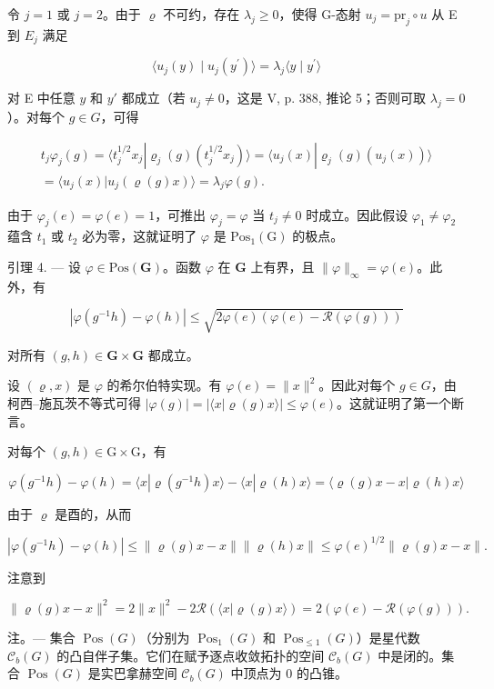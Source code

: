 令 \(j = 1\) 或 \(j = 2\)。由于 \(\varrho\) 不可约，存在 \(\lambda_j \geqslant 0\)，使得 G-态射 \(u_j = \mathrm{pr}_j \circ u\) 从 E 到 \(E_j\) 满足

\[
\langle u _ {j} (y) \mid u _ {j} (y ^ {\prime}) \rangle = \lambda_ {j} \langle y \mid y ^ {\prime} \rangle
\]

对 E 中任意 \(y\) 和 \(y'\) 都成立（若 \(u_j \neq 0\)，这是 V, p. 388, 推论 5；否则可取 \(\lambda_j = 0\)）。对每个 \(g \in G\)，可得

\[
\begin{array}{r} t _ {j} \varphi_ {j} (g) = \langle t _ {j} ^ {1 / 2} x _ {j} | \varrho_ {j} (g) (t _ {j} ^ {1 / 2} x _ {j}) \rangle = \langle u _ {j} (x) | \varrho_ {j} (g) (u _ {j} (x)) \rangle \\ = \langle u _ {j} (x) | u _ {j} (\varrho (g) x) \rangle = \lambda_ {j} \varphi (g). \end{array}
\]

由于 \(\varphi_{j}(e) = \varphi(e) = 1\)，可推出 \(\varphi_{j} = \varphi\) 当 \(t_{j} \neq 0\) 时成立。因此假设 \(\varphi_{1} \neq \varphi_{2}\) 蕴含 \(t_{1}\) 或 \(t_{2}\) 必为零，这就证明了 \(\varphi\) 是 \(\mathrm{Pos}_{1}(\mathrm{G})\) 的极点。

引理 4. --- 设 \(\varphi\in\mathrm{Pos}(\mathbf{G})\)。函数 \(\varphi\) 在 \(\mathbf{G}\) 上有界，且 \(\|\varphi\|_{\infty}=\varphi(e)\)。此外，有

\[
| \varphi (g ^ {- 1} h) - \varphi (h) | \leqslant \sqrt {2 \varphi (e) (\varphi (e) - \mathcal {R} (\varphi (g)))}\tag{1}
\]

对所有 \((g,h)\in \mathbf{G}\times \mathbf{G}\) 都成立。

设 \((\varrho, x)\) 是 \(\varphi\) 的希尔伯特实现。有 \(\varphi(e) = \|x\|^2\)。因此对每个 \(g \in G\)，由柯西–施瓦茨不等式可得 \(|\varphi(g)| = |\langle x | \varrho(g)x\rangle| \leqslant \varphi(e)\)。这就证明了第一个断言。

对每个 \((g,h)\in \mathrm{G}\times \mathrm{G}\)，有

\[
\varphi (g ^ {- 1} h) - \varphi (h) = \langle x | \varrho (g ^ {- 1} h) x \rangle - \langle x | \varrho (h) x \rangle = \langle \varrho (g) x - x | \varrho (h) x \rangle
\]

由于 \(\varrho\) 是酉的，从而

\[
| \varphi (g ^ {- 1} h) - \varphi (h) | \leqslant \| \varrho (g) x - x \| \| \varrho (h) x \| \leqslant \varphi (e) ^ {1 / 2} \| \varrho (g) x - x \|.
\]

注意到

\[
\| \varrho (g) x - x \| ^ {2} = 2 \| x \| ^ {2} - 2 \mathcal {R} (\langle x | \varrho (g) x \rangle) = 2 (\varphi (e) - \mathcal {R} (\varphi (g))).
\]

注。--- 集合 \(\operatorname{Pos}(G)\)（分别为 \(\operatorname{Pos}_{1}(G)\) 和 \(\operatorname{Pos}_{\leqslant1}(G)\)）是星代数 \(\mathcal{C}_{b}(G)\) 的凸自伴子集。它们在赋予逐点收敛拓扑的空间 \(\mathcal{C}_{b}(G)\) 中是闭的。集合 \(\operatorname{Pos}(G)\) 是实巴拿赫空间 \(\mathcal{C}_{b}(G)\) 中顶点为 0 的凸锥。

